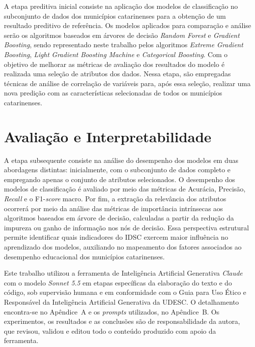 A etapa preditiva inicial consiste na aplicação dos modelos de classificação no subconjunto de dados dos municípios catarinenses para a obtenção de um resultado preditivo de referência. Os modelos aplicados para comparação e análise serão os algoritmos baseados em árvores de decisão \textit{Random Forest} e \textit{Gradient Boosting}, sendo representado neste trabalho pelos algoritmos \textit{Extreme Gradient Boosting}, \textit{Light Gradient Boosting Machine} e \textit{Categorical Boosting}. Com o objetivo de melhorar as métricas de avaliação dos resultados do modelo é realizada uma seleção de atributos dos dados. Nessa etapa, são empregadas técnicas de análise de correlação de variáveis para, após essa seleção, realizar uma nova predição com as características selecionadas de todos os municípios catarinenses. 

\section{Avaliação e Interpretabilidade}

A etapa subsequente consiste na análise do desempenho dos modelos em duas abordagens distintas: inicialmente, com o subconjunto de dados completo e empregando apenas o conjunto de atributos selecionados. O desempenho dos modelos de classificação é avaliado por meio das métricas de Acurácia, Precisão, \textit{Recall} e o F1-\textit{score} macro. Por fim, a extração da relevância dos atributos ocorrerá por meio da análise das métricas de importância intrínsecas aos algoritmos baseados em árvore de decisão, calculadas a partir da redução da impureza ou ganho de informação nos nós de decisão. Essa perspectiva estrutural permite identificar quais indicadores do IDSC exercem maior influência no aprendizado dos modelos, auxiliando no mapeamento dos fatores associados ao desempenho educacional dos municípios catarinenses.

Este trabalho utilizou a ferramenta de Inteligência Artificial Generativa \textit{Claude} com o modelo \textit{Sonnet 5.5} em etapas específicas da elaboração do texto e do código, sob supervisão humana e em conformidade com o Guia para Uso Ético e Responsável da Inteligência Artificial Generativa da UDESC. O detalhamento encontra-se no Apêndice~A e os \textit{prompts} utilizados, no Apêndice~B. Os experimentos, os resultados e as conclusões são de responsabilidade da autora, que revisou, validou e editou todo o conteúdo produzido com apoio da ferramenta.